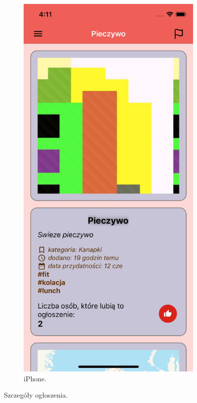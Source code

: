 \documentclass[licencjacka]{pracamgr}
\begin{document}
\begin{figure}[h!]
\begin{subfigure}[b]{0.4\linewidth}
\begin{framed}
      \includegraphics[width=\linewidth]{ios2.jpg}
    \end{framed}
    \caption{iPhone.}
  \end{subfigure}
  \caption{Szczegóły ogłoszenia.}
  \label{fig:offer}
\end{figure}
\end{document}
